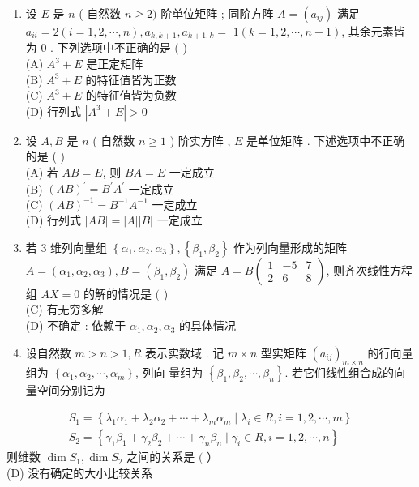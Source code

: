 \documentclass[10pt]{article}
\begin{document}
{\begin{enumerate}
  \item  设  $E$  是  $n$ ( 自然数  $n \geq 2)$  阶单位矩阵 ;  同阶方阵  $A=\left(a_{i j}\right)$  满足  $a_{i i}=2(i=1,2, \cdots, n), a_{k, k+1}, a_{k+1, k}=$ $1(k=1,2, \cdots, n-1)$,  其余元素皆为  0 .  下列选项中不正确的是  $($ )\\
(A) $A^{3}+E$  是正定矩阵 \\
(B) $A^{3}+E$  的特征值皆为正数 \\
(C) $A^{3}+E$  的特征值皆为负数 \\
(D)  行列式  $\left|A^{3}+E\right|>0$

  \item  设  $A, B$  是  $n$ ( 自然数  $n \geq 1$ )  阶实方阵 , $E$  是单位矩阵 .  下述选项中不正确的是  ( )\\
(A)  若  $A B=E$,  则  $B A=E$  一定成立 \\
(B) $(A B)^{\prime}=B^{\prime} A^{\prime}$  一定成立 \\
(C) $(A B)^{-1}=B^{-1} A^{-1}$  一定成立 \\
(D)  行列式  $|A B|=|A||B|$  一定成立 

  \item  若  3  维列向量组  $\left\{\alpha_{1}, \alpha_{2}, \alpha_{3}\right\},\left\{\beta_{1}, \beta_{2}\right\}$  作为列向量形成的矩阵  $A=\left(\alpha_{1}, \alpha_{2}, \alpha_{3}\right), B=\left(\beta_{1}, \beta_{2}\right)$  满足  $A=B\left(\begin{array}{ccc}1 & -5 & 7 \\ 2 & 6 & 8\end{array}\right)$,  则齐次线性方程组  $A X=0$  的解的情况是  $($ )\\
(C)  有无穷多解 \\
(D)  不确定 :  依赖于  $\alpha_{1}, \alpha_{2}, \alpha_{3}$  的具体情况 

  \item  设自然数  $m>n>1, R$  表示实数域 .  记  $m \times n$  型实矩阵  $\left(a_{i j}\right)_{m \times n}$  的行向量组为  $\left\{\alpha_{1}, \alpha_{2}, \cdots, \alpha_{m}\right\}$,  列向   量组为  $\left\{\beta_{1}, \beta_{2}, \cdots, \beta_{n}\right\}$.  若它们线性组合成的向量空间分别记为 

\end{enumerate}
$$
\begin{gathered}
S_{1}=\left\{\lambda_{1} \alpha_{1}+\lambda_{2} \alpha_{2}+\cdots+\lambda_{m} \alpha_{m} \mid \lambda_{i} \in R, i=1,2, \cdots, m\right\} \\
S_{2}=\left\{\gamma_{1} \beta_{1}+\gamma_{2} \beta_{2}+\cdots+\gamma_{n} \beta_{n} \mid \gamma_{i} \in R, i=1,2, \cdots, n\right\}
\end{gathered}
$$
 则维数  $\operatorname{dim} S_{1}, \operatorname{dim} S_{2}$  之间的关系是  $($ ）\\
(D)  没有确定的大小比较关系 

}
\end{document}
